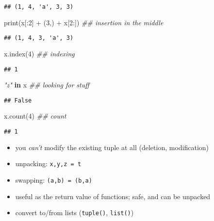 \documentclass[]{tufte-handout}
\newenvironment{Shaded}{}{}
\newcommand{\KeywordTok}[1]{\textcolor[rgb]{0.00,0.44,0.13}{\textbf{{#1}}}}
\newcommand{\DecValTok}[1]{\textcolor[rgb]{0.25,0.63,0.44}{{#1}}}
\newcommand{\CommentTok}[1]{\textcolor[rgb]{0.38,0.63,0.69}{\textit{{#1}}}}
\newcommand{\OperatorTok}[1]{\textcolor[rgb]{0.40,0.40,0.40}{{#1}}}
\newcommand{\BuiltInTok}[1]{{#1}}
\newcommand{\NormalTok}[1]{{#1}}
\providecommand{\tightlist}{%
  \setlength{\itemsep}{0pt}\setlength{\parskip}{0pt}}
\begin{document}
\begin{verbatim}
## (1, 4, 'a', 3, 3)
\end{verbatim}

\begin{Shaded}
\begin{Highlighting}[]
\BuiltInTok{print}\NormalTok{(x[:}\DecValTok{2}\NormalTok{] }\OperatorTok{+} \NormalTok{(}\DecValTok{3}\NormalTok{,) }\OperatorTok{+} \NormalTok{x[}\DecValTok{2}\NormalTok{:]) }\CommentTok{## insertion in the middle}
\end{Highlighting}
\end{Shaded}

\begin{verbatim}
## (1, 4, 3, 'a', 3)
\end{verbatim}

\begin{Shaded}
\begin{Highlighting}[]
\NormalTok{x.index(}\DecValTok{4}\NormalTok{)    }\CommentTok{## indexing}
\end{Highlighting}
\end{Shaded}

\begin{verbatim}
## 1
\end{verbatim}

\begin{Shaded}
\begin{Highlighting}[]
\CommentTok{"z"} \KeywordTok{in} \NormalTok{x      }\CommentTok{## looking for stuff}
\end{Highlighting}
\end{Shaded}

\begin{verbatim}
## False
\end{verbatim}

\begin{Shaded}
\begin{Highlighting}[]
\NormalTok{x.count(}\DecValTok{4}\NormalTok{)    }\CommentTok{## count}
\end{Highlighting}
\end{Shaded}

\begin{verbatim}
## 1
\end{verbatim}

\begin{itemize}
\tightlist
\item
  you \emph{can't} modify the existing tuple at all (deletion,
  modification)
\item
  unpacking: \texttt{x,y,z\ =\ t}
\item
  swapping: \texttt{(a,b)\ =\ (b,a)}
\item
  useful as the return value of functions; safe, and can be unpacked
\item
  convert to/from lists (\texttt{tuple()}, \texttt{list()})
\end{itemize}
\end{document}
